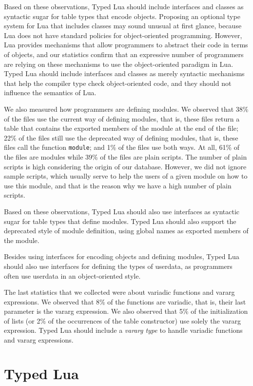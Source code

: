 Based on these observations, Typed Lua should include interfaces and
classes as syntactic sugar for table types that encode objects.
Proposing an optional type system for Lua that includes classes may
sound unusual at first glance, because Lua does not have standard
policies for object-oriented programming.
However, Lua provides mechanisms that allow programmers to abstract
their code in terms of objects, and our statistics confirm that
an expressive number of programmers are relying on these mechanisms to
use the object-oriented paradigm in Lua.
Typed Lua should include interfaces and classes as merely syntactic
mechanisms that help the compiler type check object-oriented code,
and they should not influence the semantics of Lua.

We also measured how programmers are defining modules.
We observed that 38\% of the files use the current way of defining
modules, that is, these files return a table that contains the
exported members of the module at the end of the file;
22\% of the files still use the deprecated way of defining modules,
that is, these files call the function \texttt{module};
and 1\% of the files use both ways.
At all, 61\% of the files are modules while 39\% of the files are
plain scripts.
The number of plain scripts is high considering the origin of
our database.
However, we did not ignore sample scripts, which usually serve to
help the users of a given module on how to use this module, and
that is the reason why we have a high number of plain scripts.

Based on these observations, Typed Lua should also use interfaces as
syntactic sugar for table types that define modules.
Typed Lua should also support the deprecated style of module
definition, using global names as exported members of the module.

Besides using interfaces for encoding objects and defining modules,
Typed Lua should also use interfaces for defining the types of
userdata, as programmers often use userdata in an object-oriented
style.

The last statistics that we collected were about variadic functions
and vararg expressions.
We observed that 8\% of the functions are variadic, that is,
their last parameter is the vararg expression.
We also observed that 5\% of the initialization of lists
(or 2\% of the occurrences of the table constructor) use solely the
vararg expression.
Typed Lua should include a \emph{vararg type} to handle variadic
functions and vararg expressions.

\section{Typed Lua}
\label{sec:typedlua}

